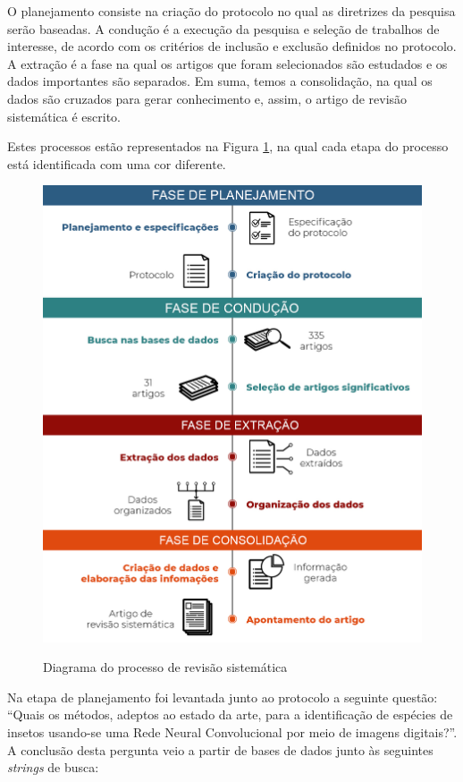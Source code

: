 \documentclass[
	12pt,				%
	oneside,			%
	a4paper,			%
	english,			%
	brazil				%
	]{abntex2ppgsi}
\begin{document}
O planejamento consiste na criação do protocolo no qual as diretrizes da pesquisa serão baseadas. A condução é a execução da pesquisa e seleção de trabalhos de interesse, de acordo com os critérios de inclusão e exclusão definidos no protocolo. A extração é a fase na qual os artigos que foram selecionados são estudados e os dados importantes são separados. Em suma, temos a consolidação, na qual os dados são cruzados para gerar conhecimento e, assim, o artigo de revisão sistemática é escrito.

Estes processos estão representados na Figura \ref{fig:processo_revisao_sistematica}, na qual cada etapa do processo está identificada com uma cor diferente.

\begin{figure}[H]
    \centering
    \caption{Diagrama do processo de revisão sistemática}
    \includegraphics[scale=.35]{imagens/revisao_sistematica/processo_revisao_sistematica.jpg}
    \label{fig:processo_revisao_sistematica}
\end{figure}

Na etapa de planejamento foi levantada junto ao protocolo a seguinte questão:
``Quais os métodos, adeptos ao estado da arte, para a identificação de espécies de insetos usando-se uma Rede Neural Convolucional por meio de imagens digitais?''.
A conclusão desta pergunta veio a partir de bases de dados junto às seguintes \textit{strings} de busca:
\end{document}
